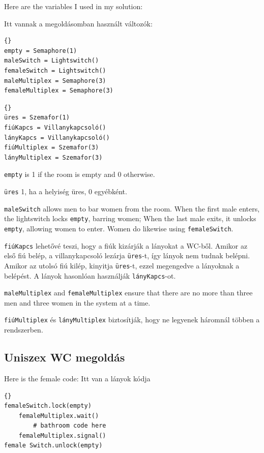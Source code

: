 \documentclass{book}
\newcommand{\clearemptydoublepage}{\newpage\cleardoublepage}
\begin{document}
Here are the variables I used in my solution:

Itt vannak a megoldásomban használt változók:

\begin{lstlisting}[title={Unisex bathroom hint}]{}
empty = Semaphore(1)
maleSwitch = Lightswitch()
femaleSwitch = Lightswitch()
maleMultiplex = Semaphore(3)
femaleMultiplex = Semaphore(3)
\end{lstlisting}

\begin{lstlisting}[title={Uniszex WC tipp}]{}
üres = Szemafor(1)
fiúKapcs = Villanykapcsoló()
lányKapcs = Villanykapcsoló()
fiúMultiplex = Szemafor(3)
lányMultiplex = Szemafor(3)
\end{lstlisting}

{\tt empty} is 1 if the room is empty and 0 otherwise.

{\tt üres} 1, ha a helyiség üres, 0 egyébként.

{\tt maleSwitch} allows men to bar women from the room.
When the first male enters, the lightswitch locks {\tt empty}, barring women;
When the last male exits, it unlocks {\tt empty}, allowing women
to enter.  Women do likewise using {\tt femaleSwitch}.

{\tt fiúKapcs} lehetővé teszi, hogy a fiúk kizárják a lányokat a WC-ből.
Amikor az első fiú belép, a villanykapcsoló lezárja {\tt üres}-t,
így lányok nem tudnak belépni. Amikor az utolsó fiú kilép, kinyitja
{\tt üres}-t, ezzel megengedve a lányoknak a belépést. A lányok
hasonlóan használják {\tt lányKapcs}-ot.

{\tt maleMultiplex} and {\tt femaleMultiplex} ensure that there are no
more than three men and three women in the system at a time.

{\tt fiúMultiplex} és {\tt lányMultiplex} biztosítják, hogy
ne legyenek háromnál többen a rendszerben.

\clearemptydoublepage
\subsection{Uniszex WC megoldás}

Here is the female code:
Itt van a lányok kódja

\begin{lstlisting}[title={Unisex bathroom solution (female)}]{}
femaleSwitch.lock(empty)
    femaleMultiplex.wait()
        # bathroom code here
    femaleMultiplex.signal()
female Switch.unlock(empty)
\end{lstlisting}
\end{document}
